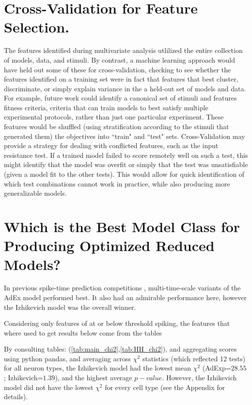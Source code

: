 
\section{Cross-Validation for Feature Selection.}
The features identified during multivariate analysis utlilized the entire collection of models, data, and stimuli.
By contrast, a machine learning approach would have held out some of these for cross-validation, checking to see whether the features identified on a training set were in fact that features that best cluster, discriminate, or simply explain variance in the a held-out set of models and data.
For example, future work could identify a canonical set of stimuli and features fitness criteria, criteria that can train models to best satisfy multiple experimental protocols, rather than just one particular experiment.
These features would be shuffled (using stratification according to the stimuli that generated them) the objectives into ``train" and ``test" sets.
Cross-Validation may provide a strategy for dealing with conflicted features, such as the input resistance test.
If a trained model failed to score remotely well on such a test, this might identify that the model was overfit or simply that the test was unsatisfiable (given a model fit to the other tests).
This would allow for quick identification of which test combinations cannot work in practice, while also producing more generalizable models.

\section{Which is the Best Model Class for Producing Optimized Reduced Models?}
In previous spike-time prediction competitions \citep{incf_multi}, multi-time-scale variants of the AdEx model performed best.
It also had an admirable performance here, however the Izhikevich model was the overall winner.

Considering only features of at or below threshold spiking, the features that where used to get results below come from the tables 

By consulting tables: (\ref{tab:main_chi2},\ref{tab:HH_chi2}), and aggregating scores using python pandas, and averaging across $\chi^{2}$ statistics (which reflected 12 tests) for all neuron types, the Izhikevich model had the lowest mean $\chi^{2}$ (AdExp=$28.55$; Izhikevich=$1.39$), and the highest average $p-value$.
However, the Izhikevich model did not have the lowest $\chi^{2}$ for every cell type (see the Appendix for details).


